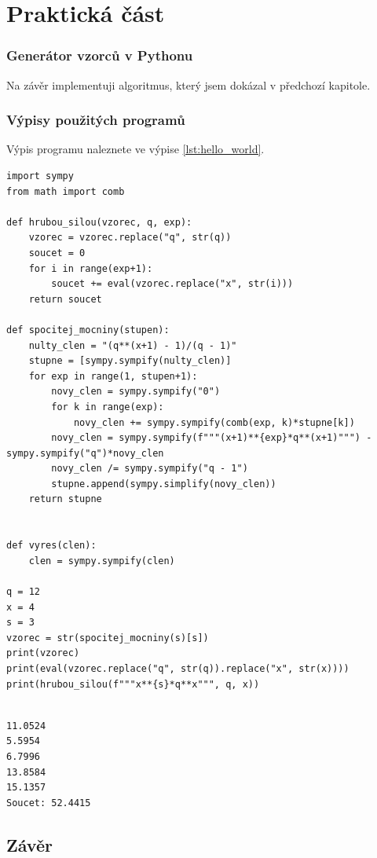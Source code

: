 \documentclass[12pt]{report}			%
\begin{document}
	\part{Praktická část}
\section{Generátor vzorců v Pythonu}
Na závěr implementuji algoritmus, který jsem dokázal v předchozí kapitole.


\section{Výpisy použitých programů}

\lipsum[1]	

Výpis programu   naleznete ve výpise \ref{lst:hello_world}.

\begin{lstlisting}[title={Generator.py}, caption={generator.py}, label={lst:hello_world}]
import sympy
from math import comb

def hrubou_silou(vzorec, q, exp):
    vzorec = vzorec.replace("q", str(q))
    soucet = 0
    for i in range(exp+1):
        soucet += eval(vzorec.replace("x", str(i)))
    return soucet

def spocitej_mocniny(stupen):
    nulty_clen = "(q**(x+1) - 1)/(q - 1)"
    stupne = [sympy.sympify(nulty_clen)]
    for exp in range(1, stupen+1):
        novy_clen = sympy.sympify("0")
        for k in range(exp):
            novy_clen += sympy.sympify(comb(exp, k)*stupne[k])
        novy_clen = sympy.sympify(f"""(x+1)**{exp}*q**(x+1)""") - sympy.sympify("q")*novy_clen
        novy_clen /= sympy.sympify("q - 1")
        stupne.append(sympy.simplify(novy_clen))
    return stupne


def vyres(clen):
    clen = sympy.sympify(clen)

q = 12
x = 4
s = 3
vzorec = str(spocitej_mocniny(s)[s])
print(vzorec)
print(eval(vzorec.replace("q", str(q)).replace("x", str(x))))
print(hrubou_silou(f"""x**{s}*q**x""", q, x))


\end{lstlisting}

\lipsum[1]	

\begin{lstlisting}[numbers=none, title={Příklad výstupního souboru}]
11.0524
5.5954
6.7996
13.8584
15.1357
Soucet: 52.4415
\end{lstlisting}

	\chapter*{Závěr}
	
\end{document}
